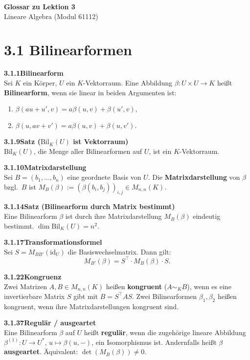 \documentclass[a4paper,12pt]{article}
\newcommand{\gentry}[3]{%
  \noindent\textbf{#1\quad #2}\nopagebreak\\[0.2em]
  #3\par\smallskip
}
\begin{document}
\begin{center}
  {\LARGE\bfseries Glossar zu Lektion 3}\\[0.5em]
  {\large Lineare Algebra (Modul 61112)}
\end{center}

\vspace{0.8em}

\section*{3.1 \quad Bilinearformen}

\gentry{3.1.1}{Bilinearform}{%
  Sei $K$ ein Körper, $U$ ein $K$-Vektorraum. Eine Abbildung $\beta: U \times U \to K$ heißt \textbf{Bilinearform}, wenn sie linear in beiden Argumenten ist:
  \begin{enumerate}[label=(\alph*), topsep=2pt, itemsep=1pt]
    \item $\beta(au + u', v) = a\beta(u,v) + \beta(u',v)$,
    \item $\beta(u, av + v') = a\beta(u,v) + \beta(u,v')$.
  \end{enumerate}
}

\gentry{3.1.9}{Satz ($\mathrm{Bil}_K(U)$ ist Vektorraum)}{%
  $\mathrm{Bil}_K(U)$, die Menge aller Bilinearformen auf $U$, ist ein $K$-Vektorraum.
}

\gentry{3.1.10}{Matrixdarstellung}{%
  Sei $B = (b_1,\ldots,b_n)$ eine geordnete Basis von $U$. Die \textbf{Matrixdarstellung} von $\beta$ bzgl.\ $B$ ist $M_B(\beta) := (\beta(b_i, b_j))_{i,j} \in M_{n,n}(K)$.
}

\gentry{3.1.14}{Satz (Bilinearform durch Matrix bestimmt)}{%
  Eine Bilinearform $\beta$ ist durch ihre Matrixdarstellung $M_B(\beta)$ eindeutig bestimmt.
  $\dim \mathrm{Bil}_K(U) = n^2$.
}

\gentry{3.1.17}{Transformationsformel}{%
  Sei $S = M_{BB'}(\mathrm{id}_U)$ die Basiswechselmatrix. Dann gilt:
  \[
    M_{B'}(\beta) = S^\top \cdot M_B(\beta) \cdot S.
  \]
}

\gentry{3.1.22}{Kongruenz}{%
  Zwei Matrizen $A, B \in M_{n,n}(K)$ heißen \textbf{kongruent} ($A \sim_K B$), wenn es eine invertierbare Matrix $S$ gibt mit $B = S^\top A S$.
  Zwei Bilinearformen $\beta_1, \beta_2$ heißen kongruent, wenn ihre Matrixdarstellungen kongruent sind.
}

\gentry{3.1.37}{Regulär / ausgeartet}{%
  Eine Bilinearform $\beta$ auf $U$ heißt \textbf{regulär}, wenn die zugehörige lineare Abbildung $\beta^{(1)}: U \to U^*$, $u \mapsto \beta(u,-)$, ein Isomorphismus ist. Andernfalls heißt $\beta$ \textbf{ausgeartet}.
  Äquivalent: $\det(M_B(\beta)) \neq 0$.
}
\end{document}
